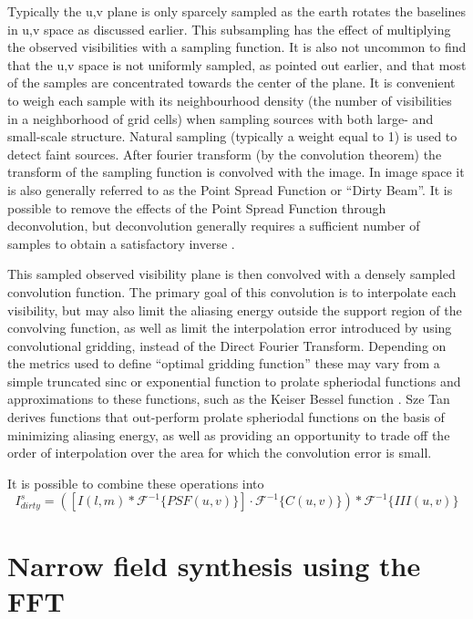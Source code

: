  Typically the u,v plane is only sparcely sampled as the earth rotates the baselines in u,v space as discussed earlier. This subsampling has the effect of multiplying the observed visibilities with a sampling function. It is also
 not uncommon to find that the u,v space is not uniformly sampled, as pointed out earlier, and that most of the samples are concentrated towards the center of the plane. It is convenient to weigh each sample with its neighbourhood density 
 (the number of visibilities in a neighborhood of grid cells) when sampling sources with both large- and small-scale structure. Natural sampling (typically a weight equal to 1) is used to detect faint sources. After fourier transform
 (by the convolution theorem) the transform of the sampling function is convolved with the image. In image space it is also generally referred to as the Point Spread Function or ``Dirty Beam''. It is possible to remove
 the effects of the Point Spread Function through deconvolution, but deconvolution generally requires a sufficient number of samples to obtain a satisfactory inverse \cite{taylor1999synthesis}.
 
 This sampled observed visibility plane is then convolved with a densely sampled convolution function. The primary goal of this convolution is to interpolate each visibility, but may also limit the aliasing energy outside the support 
 region of the convolving function, as well as limit the interpolation error introduced by using convolutional gridding, instead of the Direct Fourier Transform. Depending on the metrics used to define ``optimal gridding function'' these may vary from a simple truncated sinc or exponential function 
 \cite[Lecture 7]{taylor1999synthesis} to prolate spheriodal functions and approximations to these functions, such as the Keiser Bessel function \cite{jackson1991selection}. Sze Tan \cite{tan1986aperture} derives functions that out-perform prolate spheriodal functions
 on the basis of minimizing aliasing energy, as well as providing an opportunity to trade off the order of interpolation over the area for which the convolution error is small.
 
 It is possible to combine these operations into 
 \begin{equation*}
  I^s_{dirty} = ([I(l,m)*\mathcal{F}^{-1}\{PSF(u,v)\}]\cdot\mathcal{F}^{-1}\{C(u,v)\}) * \mathcal{F}^{-1}\{III(u,v)\}
 \end{equation*}
\section{Narrow field synthesis using the FFT}
